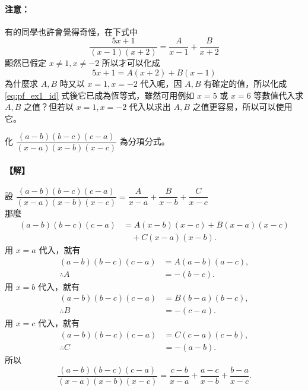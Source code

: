 \paragraph{注意：}
有的同學也許會覺得奇怪，在下式中
\begin{equation*}
  \frac{5x+1}{(x-1)(x+2)} = \frac{A}{x-1} + \frac{B}{x+2}
\end{equation*}
顯然已假定 $x \neq 1, x \neq -2$ 所以才可以化成
\begin{equation*}
  5x+1 = A(x+2)+B(x-1)
\end{equation*}
為什麼求 $A, B$ 時又以 $x=1, x=-2$ 代入呢，因 $A, B$ 有確定的值，所以化成 \eqref{eq:pf_ex1_id} 式後它已成為恆等式，雖然可用例如 $x=5$ 或 $x=6$ 等數值代入求 $A, B$ 之值？但若以 $x=1, x=-2$ 代入以求出 $A, B$ 之值更容易，所以可以使用它。

\begin{example}\label{ex:7-3-6}
化 $\dfrac{(a-b)(b-c)(c-a)}{(x-a)(x-b)(x-c)}$ 為分項分式。

\paragraph{【解】}
設 $\dfrac{(a-b)(b-c)(c-a)}{(x-a)(x-b)(x-c)} = \dfrac{A}{x-a} + \dfrac{B}{x-b} + \dfrac{C}{x-c}$\\
那麼
\begin{align*}
  (a-b)(b-c)(c-a) &= A(x-b)(x-c) + B(x-a)(x-c) \\
  &\quad + C(x-a)(x-b).
\end{align*}
用 $x=a$ 代入，就有
\begin{align*}
  (a-b)(b-c)(c-a) &= A(a-b)(a-c), \\
  \therefore A &= -(b-c).
\end{align*}
用 $x=b$ 代入，就有
\begin{align*}
  (a-b)(b-c)(c-a) &= B(b-a)(b-c), \\
  \therefore B &= -(c-a).
\end{align*}
用 $x=c$ 代入，就有
\begin{align*}
  (a-b)(b-c)(c-a) &= C(c-a)(c-b), \\
  \therefore C &= -(a-b).
\end{align*}
所以
\begin{equation*}
  \frac{(a-b)(b-c)(c-a)}{(x-a)(x-b)(x-c)} = \frac{c-b}{x-a} + \frac{a-c}{x-b} + \frac{b-a}{x-c}.
\end{equation*}
\end{example}

